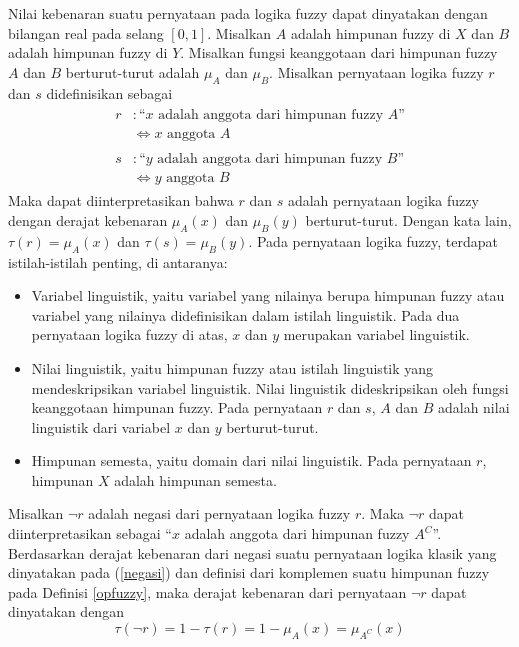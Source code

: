 \noindent Nilai kebenaran suatu pernyataan pada logika fuzzy dapat dinyatakan dengan bilangan real pada selang $[0,1]$. Misalkan $A$ adalah himpunan fuzzy di $X$ dan $B$ adalah himpunan fuzzy di $Y$. Misalkan  fungsi keanggotaan dari himpunan fuzzy $A$ dan $B$ berturut-turut adalah $\mu_A$ dan $\mu_B$. Misalkan pernyataan logika fuzzy $r$ dan $s$ 
didefinisikan sebagai 
\begin{align}
    \begin{split} \label{r}
    r &:\text{``}x \text{ adalah anggota dari himpunan fuzzy }A\text{''}\\
    &\Leftrightarrow x \text{ anggota }A
    \end{split}
    \\
    \begin{split} \label{s}
    s &:\text{``}y \text{ adalah anggota dari himpunan fuzzy }B\text{''}\\
    &\Leftrightarrow y \text{ anggota }B
    \end{split}
\end{align}
Maka dapat diinterpretasikan bahwa $r$ dan $s$ adalah pernyataan logika fuzzy dengan derajat kebenaran $\mu_A(x)$ dan $\mu_B(y)$ berturut-turut. Dengan kata lain, $\tau(r)=\mu_A(x)$ dan $\tau(s)=\mu_B(y)$. Pada pernyataan logika fuzzy, terdapat istilah-istilah penting, di antaranya:
\begin{itemize}
    \item Variabel linguistik, yaitu variabel yang nilainya berupa himpunan fuzzy atau variabel yang nilainya didefinisikan dalam istilah linguistik. Pada dua pernyataan logika fuzzy di atas, $x$ dan $y$ merupakan variabel linguistik.
    \item Nilai linguistik, yaitu himpunan fuzzy atau istilah linguistik yang mendeskripsikan variabel linguistik. Nilai linguistik dideskripsikan oleh fungsi keanggotaan himpunan fuzzy. Pada pernyataan $r$ dan $s$, $A$ dan $B$ adalah nilai linguistik dari variabel $x$ dan $y$ berturut-turut.
    \item Himpunan semesta, yaitu domain dari nilai linguistik. Pada pernyataan $r$, himpunan $X$ adalah himpunan semesta.
\end{itemize}

\noindent Misalkan $\neg r$ adalah negasi dari pernyataan logika fuzzy $r$. Maka $\neg r$ dapat diinterpretasikan sebagai ``$x$ adalah anggota dari himpunan fuzzy $A^C$''. Berdasarkan derajat kebenaran dari negasi suatu pernyataan logika klasik yang dinyatakan pada (\ref{negasi}) dan definisi dari komplemen suatu himpunan fuzzy pada Definisi \ref{opfuzzy}, maka derajat kebenaran dari pernyataan $\neg r$ dapat dinyatakan dengan
\[ \tau(\neg r) = 1 - \tau(r) = 1 - \mu_A(x) = \mu_{A^C}(x) \]

